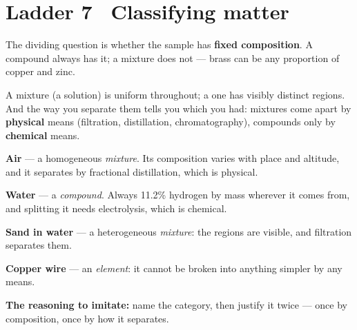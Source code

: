 \documentclass{apchem-worksheet}
\begin{document}
\section*{\sffamily Ladder 7 \textbullet\ Classifying matter}

\begin{center}
\end{center}

The dividing question is whether the sample has \textbf{fixed
composition}. A compound always has it; a mixture does not --- brass can
be any proportion of copper and zinc.

A  mixture (a solution) is uniform throughout;
a  one has visibly distinct regions. And the way you
separate them tells you which you had: mixtures come apart by
\textbf{physical} means (filtration, distillation, chromatography),
compounds only by \textbf{chemical} means.

\begin{workedexample}
\textbf{Air} --- a homogeneous \emph{mixture}. Its composition varies
with place and altitude, and it separates by fractional distillation,
which is physical.

\textbf{Water} --- a \emph{compound}. Always 11.2\% hydrogen by mass
wherever it comes from, and splitting it needs electrolysis, which is
chemical.

\textbf{Sand in water} --- a heterogeneous \emph{mixture}: the regions
are visible, and filtration separates them.

\textbf{Copper wire} --- an \emph{element}: it cannot be broken into
anything simpler by any means.

\textbf{The reasoning to imitate:} name the category, then justify it
twice --- once by composition, once by how it separates.
\end{workedexample}
\end{document}
